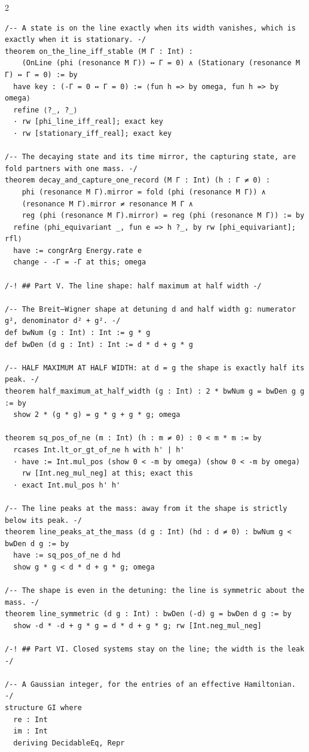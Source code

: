 \documentclass[10pt]{article}
\begin{document}
\begin{multicols}{2}
\begin{Verbatim}[fontsize=\fontsize{5.9}{6.8}\selectfont,breaklines,breakanywhere,breaksymbolleft={}]
/-- A state is on the line exactly when its width vanishes, which is exactly when it is stationary. -/
theorem on_the_line_iff_stable (M Γ : Int) :
    (OnLine (phi (resonance M Γ)) ↔ Γ = 0) ∧ (Stationary (resonance M Γ) ↔ Γ = 0) := by
  have key : (-Γ = 0 ↔ Γ = 0) := ⟨fun h => by omega, fun h => by omega⟩
  refine ⟨?_, ?_⟩
  · rw [phi_line_iff_real]; exact key
  · rw [stationary_iff_real]; exact key

/-- The decaying state and its time mirror, the capturing state, are fold partners with one mass. -/
theorem decay_and_capture_one_record (M Γ : Int) (h : Γ ≠ 0) :
    phi (resonance M Γ).mirror = fold (phi (resonance M Γ)) ∧
    (resonance M Γ).mirror ≠ resonance M Γ ∧
    reg (phi (resonance M Γ).mirror) = reg (phi (resonance M Γ)) := by
  refine ⟨phi_equivariant _, fun e => h ?_, by rw [phi_equivariant]; rfl⟩
  have := congrArg Energy.rate e
  change - -Γ = -Γ at this; omega

/-! ## Part V. The line shape: half maximum at half width -/

/-- The Breit–Wigner shape at detuning d and half width g: numerator g², denominator d² + g². -/
def bwNum (g : Int) : Int := g * g
def bwDen (d g : Int) : Int := d * d + g * g

/-- HALF MAXIMUM AT HALF WIDTH: at d = g the shape is exactly half its peak. -/
theorem half_maximum_at_half_width (g : Int) : 2 * bwNum g = bwDen g g := by
  show 2 * (g * g) = g * g + g * g; omega

theorem sq_pos_of_ne (m : Int) (h : m ≠ 0) : 0 < m * m := by
  rcases Int.lt_or_gt_of_ne h with h' | h'
  · have := Int.mul_pos (show 0 < -m by omega) (show 0 < -m by omega)
    rw [Int.neg_mul_neg] at this; exact this
  · exact Int.mul_pos h' h'

/-- The line peaks at the mass: away from it the shape is strictly below its peak. -/
theorem line_peaks_at_the_mass (d g : Int) (hd : d ≠ 0) : bwNum g < bwDen d g := by
  have := sq_pos_of_ne d hd
  show g * g < d * d + g * g; omega

/-- The shape is even in the detuning: the line is symmetric about the mass. -/
theorem line_symmetric (d g : Int) : bwDen (-d) g = bwDen d g := by
  show -d * -d + g * g = d * d + g * g; rw [Int.neg_mul_neg]

/-! ## Part VI. Closed systems stay on the line; the width is the leak -/

/-- A Gaussian integer, for the entries of an effective Hamiltonian. -/
structure GI where
  re : Int
  im : Int
  deriving DecidableEq, Repr


\end{Verbatim}
\end{multicols}
\end{document}
